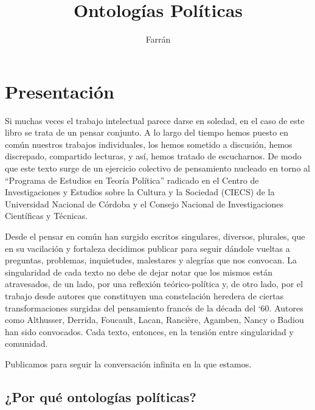 \documentclass{book}
\title{Ontologías Políticas}
\author{Farrán}
\date{}
\begin{document}
\frontmatter
\justifying
\maketitle



%
%
%
%
%
%
%
%

\tableofcontents

\chapter{Presentación}

Si muchas veces el trabajo intelectual parece darse en soledad, en el
caso de este libro se trata de un pensar conjunto. A lo largo del tiempo
hemos puesto en común nuestros trabajos individuales, los hemos sometido
a discusión, hemos discrepado, compartido lecturas, y así, hemos tratado
de escucharnos. De modo que este texto surge de un ejercicio colectivo
de pensamiento nucleado en torno al \enquote{Programa de Estudios en Teoría
Política} radicado en el Centro de Investigaciones y Estudios sobre la
Cultura y la Sociedad (CIECS) de la Universidad Nacional de Córdoba y el
Consejo Nacional de Investigaciones Científicas y Técnicas.

Desde el pensar en común han surgido escritos singulares, diversos,
plurales, que en su vacilación y fortaleza decidimos publicar para
seguir dándole vueltas a preguntas, problemas, inquietudes, malestares y
alegrías que nos convocan. La singularidad de cada texto no debe de
dejar notar que los mismos están atravesados, de un lado, por una
reflexión teórico-política y, de otro lado, por el trabajo desde autores
que constituyen una constelación heredera de ciertas transformaciones
surgidas del pensamiento francés de la década del `60. Autores como
Althusser, Derrida, Foucault, Lacan, Rancière, Agamben, Nancy o Badiou
han sido convocados. Cada texto, entonces, en la tensión entre
singularidad y comunidad.

Publicamos para seguir la conversación infinita en la que estamos.

\section{¿Por qué ontologías políticas?}
\end{document}
